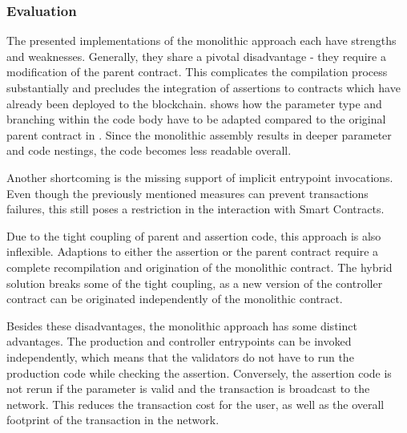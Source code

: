 \subsubsection{Evaluation}
The presented implementations of the monolithic approach each have strengths and weaknesses. Generally, they share a pivotal disadvantage - they require a modification of the parent contract. This complicates the compilation process substantially and precludes the integration of assertions to contracts which have already been deployed to the blockchain.  shows how the parameter type and branching within the code body have to be adapted compared to the original parent contract in . Since the monolithic assembly results in deeper parameter and code nestings, the code becomes less readable overall.


Another shortcoming is the missing support of implicit entrypoint invocations. Even though the previously mentioned measures can prevent transactions failures, this still poses a restriction in the interaction with Smart Contracts. 

Due to the tight coupling of parent and assertion code, this approach is also inflexible. Adaptions to either the assertion or the parent contract require a complete recompilation and origination of the monolithic contract. The hybrid solution breaks some of the tight coupling, as a new version of the controller contract can be originated independently of the monolithic contract.

Besides these disadvantages, the monolithic approach has some distinct advantages. The production and controller entrypoints can be invoked independently, which means that the validators do not have to run the production code while checking the assertion. Conversely, the assertion code is not rerun if the parameter is valid and the transaction is broadcast to the network. This reduces the transaction cost for the user, as well as the overall footprint of the transaction in the network.

